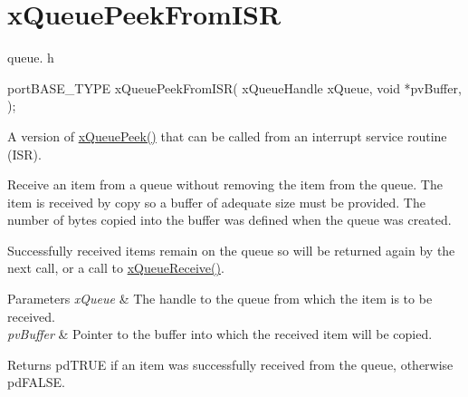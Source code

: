 \hypertarget{group__xQueuePeekFromISR}{}\section{x\+Queue\+Peek\+From\+I\+SR}
\label{group__xQueuePeekFromISR}
queue. h 
\begin{DoxyPre}
portBASE\_TYPE xQueuePeekFromISR(
                                xQueueHandle xQueue,
                                void *pvBuffer,
                            );\end{DoxyPre}


A version of \hyperlink{queue_8h_a2df70733bb875477cd9614c5b3446257}{x\+Queue\+Peek()} that can be called from an interrupt service routine (I\+SR).

Receive an item from a queue without removing the item from the queue. The item is received by copy so a buffer of adequate size must be provided. The number of bytes copied into the buffer was defined when the queue was created.

Successfully received items remain on the queue so will be returned again by the next call, or a call to \hyperlink{queue_8h_af1549eac0e7f05694a59a0b967c80be3}{x\+Queue\+Receive()}.


\begin{DoxyParams}{Parameters}
{\em x\+Queue} & The handle to the queue from which the item is to be received.\\
\hline
{\em pv\+Buffer} & Pointer to the buffer into which the received item will be copied.\\
\hline
\end{DoxyParams}
\begin{DoxyReturn}{Returns}
pd\+T\+R\+UE if an item was successfully received from the queue, otherwise pd\+F\+A\+L\+SE. 
\end{DoxyReturn}
